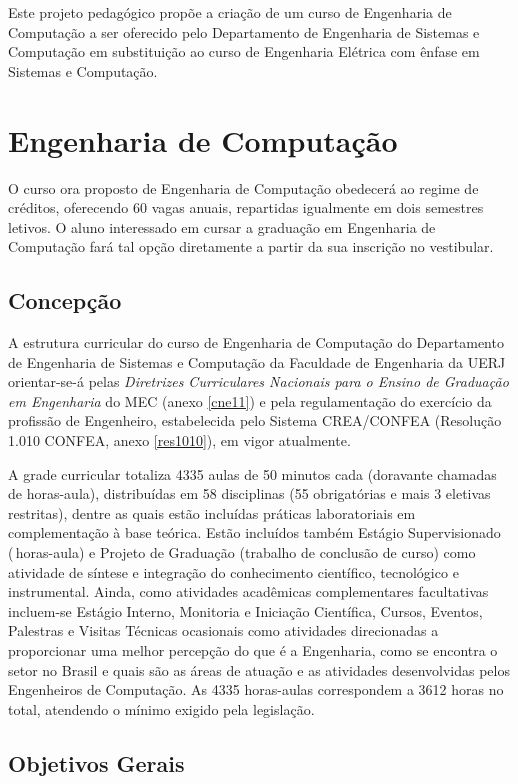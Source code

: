 Este projeto pedagógico propõe a criação de um curso de Engenharia de Computação a ser oferecido pelo Departamento de Engenharia de Sistemas e Computação em substituição ao curso de Engenharia Elétrica com ênfase em Sistemas e Computação.

\chapter{Engenharia de Computação}
O curso ora proposto de Engenharia de Computação obedecerá ao regime de créditos, oferecendo 60 vagas anuais, repartidas igualmente em dois semestres letivos. O aluno interessado em cursar a graduação em Engenharia de Computação fará tal opção diretamente a partir da sua inscrição no vestibular.

\section{Concepção}

A estrutura curricular do curso de Engenharia de Computação do Departamento de Engenharia de Sistemas e Computação da Faculdade de Engenharia da UERJ orientar-se-á pelas \textit{Diretrizes Curriculares Nacionais para o Ensino de Graduação em Engenharia} do MEC (anexo \ref{cne11}) e pela regulamentação do exercício da profissão de Engenheiro, estabelecida pelo Sistema CREA/CONFEA (Resolução 1.010 CONFEA, anexo \ref{res1010}), em vigor atualmente. 

A grade curricular totaliza 4335 aulas de 50 minutos cada (doravante chamadas de horas-aula), distribuídas em 58 disciplinas (55 obrigatórias e mais 3 eletivas restritas), dentre as quais estão incluídas práticas laboratoriais em complementação à base teórica. Estão incluídos também Estágio Supervisionado (\EstSupCH\,horas-aula) e Projeto de Graduação (trabalho de conclusão de curso) como atividade de síntese e integração do conhecimento científico, tecnológico e instrumental. Ainda, como atividades acadêmicas complementares facultativas incluem-se Estágio Interno, Monitoria e Iniciação Científica, Cursos, Eventos, Palestras e Visitas Técnicas ocasionais como atividades direcionadas a proporcionar uma melhor percepção do que é a Engenharia, como se encontra o setor no Brasil e quais são as áreas de atuação e as atividades desenvolvidas pelos Engenheiros de Computação. As 4335 horas-aulas correspondem a 3612 horas no total, atendendo o mínimo exigido pela legislação. 

\section{Objetivos Gerais}

